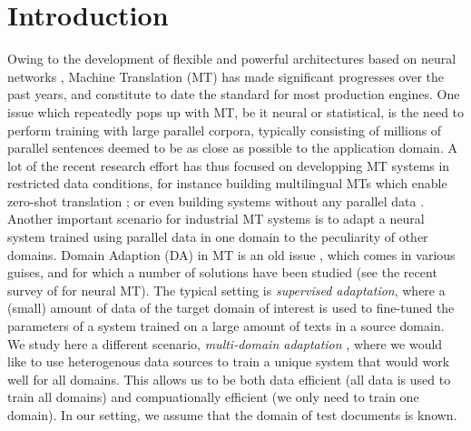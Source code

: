 \documentclass[11pt,a4paper]{article}
\begin{document}
\section{Introduction \label{sec:introduction}}
Owing to the development of flexible and powerful architectures based on neural networks \cite{Cho14properties,Bahdanau15learning,Ghering17convolutional,Vaswani17attention}, Machine Translation (MT) has made significant progresses over the past years, and constitute to date the standard for most production engines. One issue which repeatedly pops up with MT, be it neural or statistical, is the need to perform training with large parallel corpora, typically consisting of millions of parallel sentences deemed to be as close as possible to the application domain. A lot of the recent research effort has thus focused on developping MT systems in restricted data conditions, for instance building multilingual MTs which enable zero-shot translation \cite{Firat16multiway,Ha16towards,Johnson17google}; or even building systems without any parallel data \cite{Artetxe18unsupervised,Lample18unsupervised}.
Another important scenario for industrial MT systems is to adapt a neural system trained using parallel data in one domain to the peculiarity of other domains. Domain Adaption (DA) in MT is an old issue \cite{Foster07mixture,Axelrod11domain}, which comes in various guises, and for which a number of solutions have been studied (see the recent survey of \cite{Chu18asurvey} for neural MT). The typical setting is \emph{supervised adaptation}, where a (small) amount of data of the target domain of interest is used to fine-tuned the parameters of a system trained on a large amount of texts in a source domain. We study here a different scenario, \emph{multi-domain adaptation} \cite{Sennrich13multidomain,Farajian17multidomain}, where we would like to use heterogenous data sources to train a unique system that would work well for all domains. This allows us to be both data efficient (all data is used to train all domains) and compuationally efficient (we only need to train one domain). In our setting, we assume that the domain of test documents is known.
\end{document}
